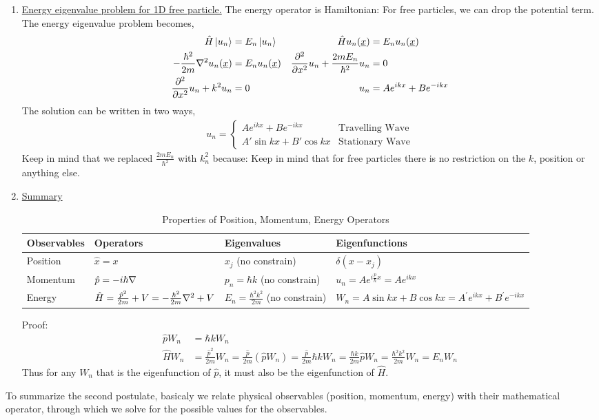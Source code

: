 \documentclass{school-22.101-notes}
\begin{document}
\begin{enumerate}
\item \uline{Energy eigenvalue problem for 1D free particle.} The energy operator is Hamiltonian: 
For free particles, we can drop the potential term. The energy eigenvalue problem becomes,
\begin{align}
  \hat{H} \left| u_n \right> &= E_n \left| u_n \right> &  \hat{H} u_n (\underline{x}) &= E_n u_n (\underline{x} ) \\
  -\frac{\hbar^2}{2m} \nabla^2 u_n (\underline{x}) &= E_n u_n (\underline{x} )  &  \frac{\partial^{2} }{\partial x ^{2}} u_n + \frac{2m E_n}{\hbar^2} u_n &= 0 \\
 \frac{\partial^{2} }{\partial x ^{2}} u_n + k^2 u_n &= 0   & u_n &= A e^{ikx} + B e^{-ikx} 
\end{align}
The solution can be written in two ways, 
\begin{align}
  u_n = \left\{ 
  \begin{array}{cc}
    A e^{ikx} + B e^{-ikx} & \mbox{Travelling Wave} \\
    A' \sin kx + B' \cos kx  & \mbox{Stationary Wave} 
  \end{array}
  \right.
\end{align}
Keep in mind that we replaced $\frac{2m E_n}{\hbar^2}$ with $k_n^2$ because:
Keep in mind that for free particles there is no restriction on the $k$, position or anything else. 


\item \uline{Summary}
\begin{table}[ht]
\begin{tabular}{|l|p{1.6in}|l|p{2in}|} \hline
Observables & Operators & Eigenvalues & Eigenfunctions \\ \hline
Position & $\hat{x} = x$ & $x_j$ (no constrain) & $\delta(x-x_j)$ \\ \hline
Momentum & $\hat{p} = - i \hbar \nabla $ & $p_n = \hbar k$ (no constrain) & $u_n = A e^{i \frac{p}{\hbar} x } = A e^{i k x} $ \\ \hline
Energy & $\hat{H} = \frac{\hat{p}^2}{2m} + V = - \frac{\hbar^2}{2m} \nabla^2 + V$ & $E_n = \frac{\hbar^2 k^2}{2m}$ (no constrain) & $W_n = A \sin kx + B \cos kx = A^{\prime} e^{ikx} + B^{\prime} e^{-ikx} $\\ \hline
\end{tabular}
\caption{Properties of Position, Momentum, Energy Operators}
\end{table}

 Proof:
\begin{align}
\hat{p} W_n &= \hbar k W_n \\
\hat{H} W_n &= \frac{\hat{p}^2}{2m} W_n 
= \frac{\hat{p}}{2m} (\hat{p} W_n) 
= \frac{\hat{p}}{2m} \hbar k W_n = \frac{\hbar k}{2m} \hat{p} W_n = \frac{\hbar^2 k^2}{2m} W_n = E_n W_n
\end{align}
Thus for any $W_n$ that is the eigenfunction of $\hat{p}$, it must also be the eigenfunction of $\hat{H}$. 
\end{enumerate}
To summarize the second postulate, basicaly we relate physical observables (position, momentum, energy) with their mathematical operator, through which we solve for the possible values for the observables.
\end{document}
